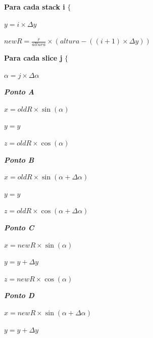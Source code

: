 \documentclass[12pt]{article}
\begin{document}
\textbf{Para cada stack i} $\{$\newline
\par $y = i \times \Delta y$ \newline
\par $newR = \frac{r}{altura} \times (altura - ((i+1) \times \Delta y))$ \newline
\par \textbf{Para cada slice j} $\{$ \newline
\par $\alpha = j \times \Delta\alpha$ \newline\newline
\par\textit{\textbf{Ponto A}} \newline
\par$x = oldR\times\sin(\alpha)$ \newline
\par$y = y$ \newline
\par$z = oldR\times\cos(\alpha)$ \newline\newline
\par\textit{\textbf{Ponto B}} \newline
\par$x = oldR\times\sin(\alpha + \Delta\alpha)$ \newline
\par$y = y$ \newline
\par$z = oldR\times\cos(\alpha + \Delta\alpha)$ \newline\newline
\par\textit{\textbf{Ponto C}} \newline
\par$x = newR\times\sin(\alpha)$ \newline
\par$y = y + \Delta y$ \newline
\par$z = newR\times\cos(\alpha)$ \newline\newline
\par\textit{\textbf{Ponto D}} \newline
\par$x = newR\times\sin(\alpha + \Delta\alpha)$ \newline
\par$y = y + \Delta y$ \newline
\end{document}

